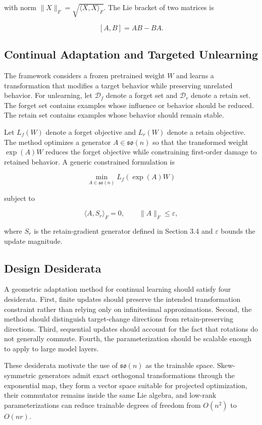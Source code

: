 \documentclass[
]{article}
\begin{document}
with norm \(\|X\|_F=\sqrt{\langle X,X\rangle_F}\). The Lie bracket of two matrices is

\[
[A,B]=AB-BA.
\]

\subsection{Continual Adaptation and Targeted Unlearning}\label{continual-adaptation-and-targeted-unlearning}

The framework considers a frozen pretrained weight \(W\) and learns a transformation that modifies a target behavior while preserving unrelated behavior. For unlearning, let \(\mathcal{D}_f\) denote a forget set and \(\mathcal{D}_r\) denote a retain set. The forget set contains examples whose influence or behavior should be reduced. The retain set contains examples whose behavior should remain stable.

Let \(L_f(W)\) denote a forget objective and \(L_r(W)\) denote a retain objective. The method optimizes a generator \(A\in\mathfrak{so}(n)\) so that the transformed weight \(\exp(A)W\) reduces the forget objective while constraining first-order damage to retained behavior. A generic constrained formulation is

\[
\min_{A\in\mathfrak{so}(n)} L_f(\exp(A)W)
\]

subject to

\[
\langle A,S_r\rangle_F=0,\qquad \|A\|_F\leq \varepsilon,
\]

where \(S_r\) is the retain-gradient generator defined in Section 3.4 and \(\varepsilon\) bounds the update magnitude.

\subsection{Design Desiderata}\label{design-desiderata}

A geometric adaptation method for continual learning should satisfy four desiderata. First, finite updates should preserve the intended transformation constraint rather than relying only on infinitesimal approximations. Second, the method should distinguish target-change directions from retain-preserving directions. Third, sequential updates should account for the fact that rotations do not generally commute. Fourth, the parameterization should be scalable enough to apply to large model layers.

These desiderata motivate the use of \(\mathfrak{so}(n)\) as the trainable space. Skew-symmetric generators admit exact orthogonal transformations through the exponential map, they form a vector space suitable for projected optimization, their commutator remains inside the same Lie algebra, and low-rank parameterizations can reduce trainable degrees of freedom from \(O(n^2)\) to \(O(nr)\).
\end{document}
